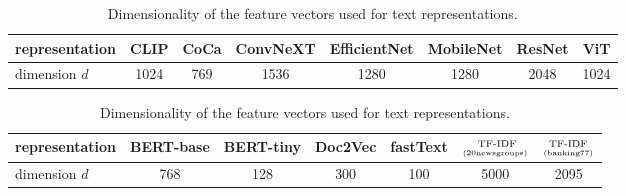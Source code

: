 \begin{table}[t]
    \centering
    \small
    \setlength{\tabcolsep}{0.56em}
    \renewcommand{\arraystretch}{1.5}
    \begin{tabular}{l|ccccccc}
        \toprule
        \toprule
            representation
            & CLIP
            & CoCa
            & ConvNeXT
            & EfficientNet
            & MobileNet
            & ResNet
            & ViT
            \\
        \midrule
            dimension $d$
            & 1024
            & 769
            & 1536
            & 1280
            & 1280
            & 2048
            & 1024
            \\
        \bottomrule
        \bottomrule
    \end{tabular}
    \caption{Dimensionality of the feature vectors used for image representations.}
    \label{tab:image-dimensions}
    \vspace{-0.5em}  %
    \begin{tabular}{l|cccccc}
        \toprule
        \toprule
            representation
            & BERT-base
            & BERT-tiny
            & Doc2Vec
            & fastText
            & ${}^\text{~~~~TF-IDF}_\text{\tiny(20newsgroups)}$
            & ${}^\text{~\,TF-IDF}_\text{\tiny(banking77)}$
            \\
        \midrule
            dimension $d$
            & 768
            & 128
            & 300
            & 100
            & 5000
            & 2095
            \\
        \bottomrule
        \bottomrule
    \end{tabular}
    \caption{Dimensionality of the feature vectors used for text representations.}
    \label{tab:text-dimensions}
    \vspace{-1.8em}  %
\end{table}

